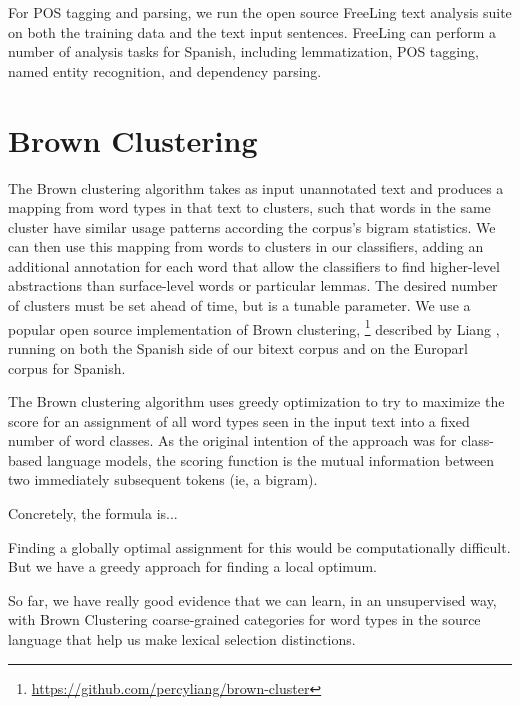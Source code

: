 For POS tagging and parsing, we run the open source FreeLing text analysis
suite \cite{padro12} on both the training data and the text input sentences.
FreeLing can perform a number of analysis tasks for Spanish, including
lemmatization, POS tagging, named entity recognition, and dependency parsing.




\section{Brown Clustering}
The Brown clustering algorithm takes as input unannotated text and produces a
mapping from word types in that text to clusters, such that words in the same
cluster have similar usage patterns according the corpus's bigram statistics.
We can then use this mapping from words to clusters in our classifiers, adding
an additional annotation for each word that allow the classifiers to find
higher-level abstractions than surface-level words or particular lemmas.
The desired number of clusters must be set ahead of time, but is a tunable
parameter.
We use a popular open source implementation of Brown clustering,
\footnote{\url{https://github.com/percyliang/brown-cluster}} described by
Liang \cite{Liang05semi-supervisedlearning}, running on both the Spanish
side of our bitext corpus and on the Europarl corpus \cite{europarl} for
Spanish.

The Brown clustering algorithm uses greedy optimization to try to maximize the
score for an assignment of all word types seen in the input text into a fixed
number of word classes. As the original intention of the approach was for
class-based language models, the scoring function is the mutual information
between two immediately subsequent tokens (ie, a bigram).

Concretely, the formula is...


Finding a globally optimal assignment for this would be computationally
difficult. But we have a greedy approach for finding a local optimum.


So far, we have really good evidence that we can learn, in an unsupervised way,
with Brown Clustering coarse-grained categories for word types in the source
language that help us make lexical selection distinctions.

